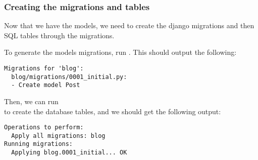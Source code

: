 \subsubsection{Creating the migrations and tables}
    Now that we have the models, we need to create the django migrations 
    and then SQL tables through the migrations.
    
    To generate the models migrations, run .
    This should output the following:
            
    \begin{lstlisting}[numbers=none]
Migrations for 'blog':
  blog/migrations/0001_initial.py:
  - Create model Post
    \end{lstlisting}
        
    Then, we can run \\  to create the database tables,
    and we should get the following output:
            
    \begin{lstlisting}[numbers=none]
Operations to perform:
  Apply all migrations: blog
Running migrations:
  Applying blog.0001_initial... OK
    \end{lstlisting}
